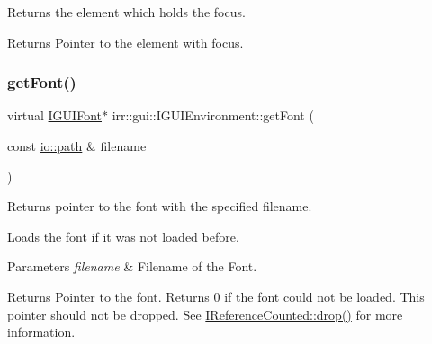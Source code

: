 Returns the element which holds the focus. 

\begin{DoxyReturn}{Returns}
Pointer to the element with focus. 
\end{DoxyReturn}
\mbox{\label{classirr_1_1gui_1_1IGUIEnvironment_a22074f9a1a5a86d5d216126bbb90b3b1}} 
\subsubsection{\texorpdfstring{get\+Font()}{getFont()}\hspace{0.1cm}{\footnotesize\ttfamily [1/2]}}
{\footnotesize\ttfamily virtual \hyperlink{classirr_1_1gui_1_1IGUIFont}{I\+G\+U\+I\+Font}$\ast$ irr\+::gui\+::\+I\+G\+U\+I\+Environment\+::get\+Font (\begin{DoxyParamCaption}\item[{const \hyperlink{namespaceirr_1_1io_a6468281622ce3a1c46b72e19f32dded5}{io\+::path} \&}]{filename }\end{DoxyParamCaption})\hspace{0.3cm}{\ttfamily [pure virtual]}}



Returns pointer to the font with the specified filename. 

Loads the font if it was not loaded before. 
\begin{DoxyParams}{Parameters}
{\em filename} & Filename of the Font. \\
\hline
\end{DoxyParams}
\begin{DoxyReturn}{Returns}
Pointer to the font. Returns 0 if the font could not be loaded. This pointer should not be dropped. See \hyperlink{classirr_1_1IReferenceCounted_a03856a09355b89d178090c4a5f738543}{I\+Reference\+Counted\+::drop()} for more information. 
\end{DoxyReturn}
\mbox{\label{classirr_1_1gui_1_1IGUIEnvironment_a22074f9a1a5a86d5d216126bbb90b3b1}} 
